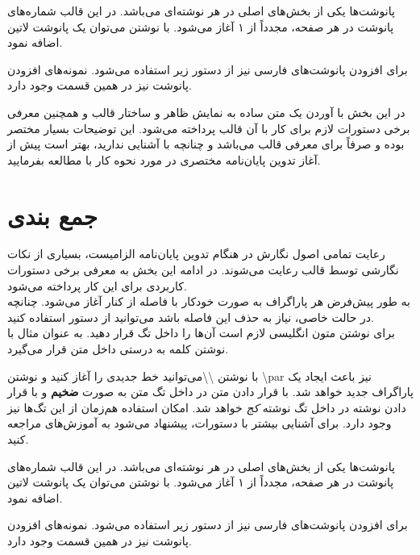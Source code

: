  پانوشت‌‌ها یکی از بخش‌های اصلی در هر نوشته‌ای می‌باشد. در این قالب شماره‌های پانوشت در هر صفحه، مجدداً از ۱ آغاز می‌شود.  با نوشتن
 \RTL{} \noindent
  می‌توان یک پانوشت لاتین اضافه نمود.
 \par
برای افزودن پانوشت‌های فارسی نیز از دستور زیر استفاده می‌شود.
 \RTL{} \noindent
نمونه‌های افزودن پانوشت نیز در همین قسمت وجود دارد.


در این بخش با آوردن یک متن ساده به نمایش ظاهر و ساختار قالب و همچنین معرفی برخی دستورات لازم برای کار با آن قالب پرداخته می‌شود. این توضیحات بسیار مختصر بوده و صرفاً برای معرفی قالب می‌باشد و چنانچه با  آشنایی ندارید، بهتر است پیش از آغاز تدوین پایان‌نامه مختصری در مورد نحوه کار با  مطالعه بفرمایید.
\section{جمع بندی}
رعایت تمامی اصول نگارش در هنگام تدوین پایان‌نامه الزامیست، بسیاری از نکات نگارشی توسط قالب رعایت می‌شوند. در ادامه این بخش به معرفی برخی دستورات کاربردی برای این کار پرداخته می‌شود.
\\
به طور پیش‌‌فرض هر پاراگراف به صورت خودکار با فاصله  از کنار آغاز می‌شود.  چنانچه در حالت خاصی، نیاز به حذف این فاصله باشد می‌توانید از دستور 
 \RTL{}\noindent
استفاده کنید.\\
برای نوشتن متون انگلیسی لازم است آن‌ها را داخل تگ
 قرار دهید. به عنوان مثال با نوشتن 
 کلمه  به درستی داخل متن قرار می‌گیرد.
 \par
 با نوشتن \textbackslash\textbackslash می‌توانید خط جدیدی را آغاز کنید و نوشتن \textbackslash par نیز باعث ایجاد یک پاراگراف جدید خواهد شد. با قرار دادن متن در داخل تگ  متن به صورت \textbf{ضخیم} و با قرار دادن نوشته در داخل تگ  نوشته \textit{کج} خواهد شد. امکان استفاده هم‌زمان از این تگ‌ها نیز وجود دارد. برای آشنایی بیشتر با دستورات، پیشنهاد می‌شود به آموزش‌های  مراجعه کنید.
 \par

 پانوشت‌‌ها یکی از بخش‌های اصلی در هر نوشته‌ای می‌باشد. در این قالب شماره‌های پانوشت در هر صفحه، مجدداً از ۱ آغاز می‌شود.  با نوشتن
 \RTL{} \noindent
  می‌توان یک پانوشت لاتین اضافه نمود.
 \par
برای افزودن پانوشت‌های فارسی نیز از دستور زیر استفاده می‌شود.
 \RTL{} \noindent
نمونه‌های افزودن پانوشت نیز در همین قسمت وجود دارد.


